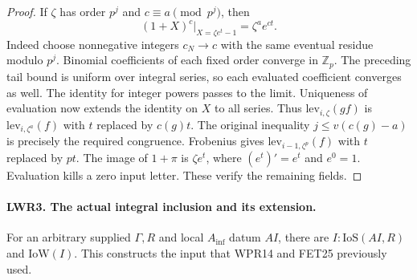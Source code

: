 \begin{proof}
If $\zeta$ has order $p^j$ and $c\equiv a\pmod{p^j}$, then
\[
 (1+X)^c\big|_{X=\zeta e^t-1}=\zeta^a e^{ct}.
\]
Indeed choose nonnegative integers $c_N\to c$ with the same eventual
residue modulo $p^j$. Binomial coefficients of each fixed order
converge in $\mathbb Z_p$. The preceding tail bound is uniform over
integral series, so each evaluated coefficient converges as well.
The identity for integer powers passes to the limit.
Uniqueness of evaluation now extends the identity on $X$ to all
series. Thus $\mathrm{lev}_{i,\zeta}(g f)$ is
$\mathrm{lev}_{i,\zeta^a}(f)$ with $t$ replaced by $c(g)t$.
The original inequality $j\le v(c(g)-a)$ is precisely the required
congruence. Frobenius gives $\mathrm{lev}_{i-1,\zeta^p}(f)$ with
$t$ replaced by $pt$. The image of $1+\pi$ is $\zeta e^t$, where
$(e^t)'=e^t$ and $e^0=1$. Evaluation kills a zero input letter.
These verify the remaining fields.
\end{proof}

\paragraph{LWR3. The actual integral inclusion and its extension.}
\label{claim:LWR3}
For an arbitrary supplied $\Gamma,R$ and local $A_{\inf}$ datum
$AI$, there are $I:\mathrm{IoS}(AI,R)$ and $\mathrm{IoW}(I)$.
This constructs the input that WPR14 and FET25 previously used.

